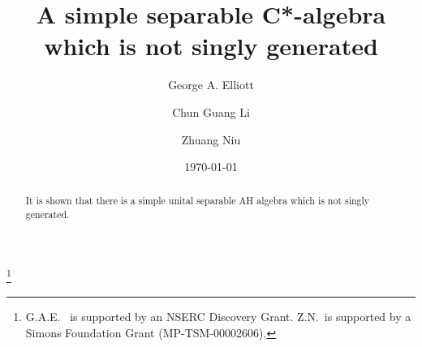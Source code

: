 \documentclass[12pt, oneside, psamsfonts]{amsart}
\theoremstyle{definition}
\theoremstyle{remark}
\numberwithin{equation}{section}
\begin{document}


\title{A simple separable C*-algebra which is not singly generated}

\author{George A. Elliott}
\address{Department of Mathematics, University of Toronto, Toronto, Ontario, Canada~\ M5S 2E4}

\author{Chun Guang Li}
\address{
School of Mathematics and Statistics, Northeast Normal University, Changchun, 130024, P. R.~China
}


\author{Zhuang Niu}
\address{Department of Mathematics, University of Wyoming, Laramie, WY, 82071, USA}

\thanks{G.A.E.~ is supported by an NSERC Discovery Grant. Z.N.~is supported by a Simons Foundation Grant (MP-TSM-00002606).}



\date{\today}


\begin{abstract}
It is shown that there is a simple unital separable AH algebra which is not singly generated.
\end{abstract}

\maketitle

\setcounter{tocdepth}{1}
\end{document}
